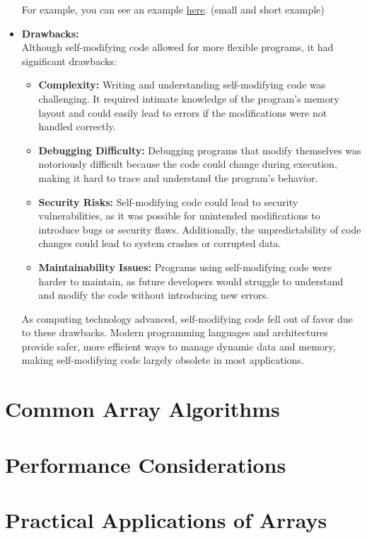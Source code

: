 \documentclass{book}
\begin{document}
\begin{itemize}
		For example, you can see an example \href{https://github.com/m-mdy-m/Arliz/blob/main/Self-Modifying-Code/index.asm}{here}. (small and short example)
		
		\item \textbf{Drawbacks:} \\
		Although self-modifying code allowed for more flexible programs, it had significant drawbacks:
		\begin{itemize}
			\item \textbf{Complexity:} Writing and understanding self-modifying code was challenging. It required intimate knowledge of the program's memory layout and could easily lead to errors if the modifications were not handled correctly.
			\item \textbf{Debugging Difficulty:} Debugging programs that modify themselves was notoriously difficult because the code could change during execution, making it hard to trace and understand the program's behavior.
			\item \textbf{Security Risks:} Self-modifying code could lead to security vulnerabilities, as it was possible for unintended modifications to introduce bugs or security flaws. Additionally, the unpredictability of code changes could lead to system crashes or corrupted data.
			\item \textbf{Maintainability Issues:} Programs using self-modifying code were harder to maintain, as future developers would struggle to understand and modify the code without introducing new errors.
		\end{itemize}
		
		As computing technology advanced, self-modifying code fell out of favor due to these drawbacks. Modern programming languages and architectures provide safer, more efficient ways to manage dynamic data and memory, making self-modifying code largely obsolete in most applications.
	\end{itemize}

\section{Common Array Algorithms}
\section{Performance Considerations}
\section{Practical Applications of Arrays}
\end{document}
